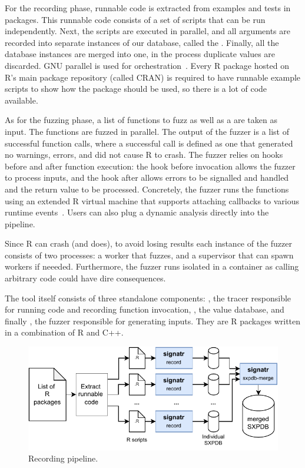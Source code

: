 \documentclass[sigplan,screen]{acmart}
\begin{document}
For the recording phase, runnable code is extracted from examples and tests in packages.  
This runnable code consists of a set of scripts
that can be run independently. Next, the scripts are
executed in parallel, and all arguments are recorded into separate instances of
our database, called the \sxpdb.  Finally, all the database instances
are merged into one, in the process duplicate values are discarded. 
GNU parallel is used for orchestration~\cite{tange2011_parallel}.
Every R package hosted on R's main package repository (called CRAN) 
is required to have runnable example scripts to show how the package 
should be used, so there is a lot of code available.

As for the fuzzing phase, a list of functions to fuzz as well as a
\sxpdb are taken as input. The functions are fuzzed in parallel.  The
output of the fuzzer is a list of successful function calls, where a
successful call is defined as one that generated no warnings, errors,
and did not cause R to crash.  The fuzzer relies on hooks before and
after function execution: the hook before invocation allows the fuzzer
to process inputs, and the hook after allows errors to be signalled
and handled and the return value to be processed.  Concretely, the fuzzer runs the functions using an
extended R virtual machine that supports attaching callbacks to
various runtime events~\cite{goel2019}.  Users can also plug a
dynamic analysis directly into the pipeline.

Since R can crash (and does), to avoid losing results each instance
of the fuzzer consists of two processes: a worker that fuzzes, and a
supervisor that can spawn workers if neeeded.  Furthermore, the fuzzer
runs isolated in a container as calling arbitrary code could have dire
consequences.

The tool itself consists of three standalone components: ,
the tracer responsible for running code and recording function
invocation, , the value database, and finally , the
fuzzer responsible for generating inputs. They are R
packages written in a combination of R and C++.

\begin{figure}
    \centering
    \includegraphics[width=\columnwidth]{code-and-figures/sxdb-pipeline.pdf}
    \caption{ Recording pipeline.  }\label{fig:sxpdb-pipeline}
\end{figure}
\end{document}
